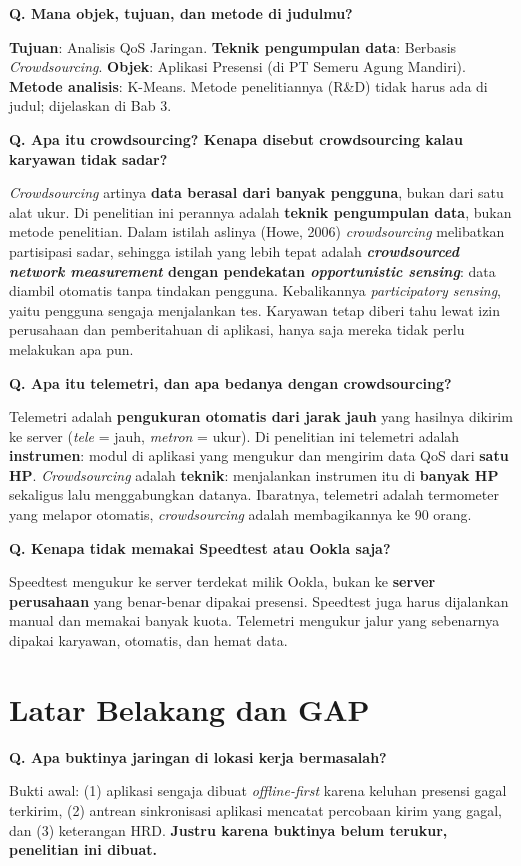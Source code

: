\documentclass[11pt,a4paper]{article}
\newcounter{q}
\newcommand{\tanya}[2]{\stepcounter{q}%
\par\vspace{6pt}\noindent\colorbox{band}{\parbox{\dimexpr\linewidth-2\fboxsep}{\textbf{Q\arabic{q}. #1}}}\par\vspace{2pt}#2\par}
\begin{document}
\tanya{Mana objek, tujuan, dan metode di judulmu?}{\textbf{Tujuan}: Analisis QoS Jaringan. \textbf{Teknik pengumpulan data}: Berbasis \textit{Crowdsourcing}. \textbf{Objek}: Aplikasi Presensi (di PT Semeru Agung Mandiri). \textbf{Metode analisis}: K-Means. Metode penelitiannya (R\&D) tidak harus ada di judul; dijelaskan di Bab 3.}

\tanya{Apa itu crowdsourcing? Kenapa disebut crowdsourcing kalau karyawan tidak sadar?}{\textit{Crowdsourcing} artinya \textbf{data berasal dari banyak pengguna}, bukan dari satu alat ukur. Di penelitian ini perannya adalah \textbf{teknik pengumpulan data}, bukan metode penelitian. Dalam istilah aslinya (Howe, 2006) \textit{crowdsourcing} melibatkan partisipasi sadar, sehingga istilah yang lebih tepat adalah \textbf{\textit{crowdsourced network measurement} dengan pendekatan \textit{opportunistic sensing}}: data diambil otomatis tanpa tindakan pengguna. Kebalikannya \textit{participatory sensing}, yaitu pengguna sengaja menjalankan tes. Karyawan tetap diberi tahu lewat izin perusahaan dan pemberitahuan di aplikasi, hanya saja mereka tidak perlu melakukan apa pun.}

\tanya{Apa itu telemetri, dan apa bedanya dengan crowdsourcing?}{Telemetri adalah \textbf{pengukuran otomatis dari jarak jauh} yang hasilnya dikirim ke server (\textit{tele} = jauh, \textit{metron} = ukur). Di penelitian ini telemetri adalah \textbf{instrumen}: modul di aplikasi yang mengukur dan mengirim data QoS dari \textbf{satu HP}. \textit{Crowdsourcing} adalah \textbf{teknik}: menjalankan instrumen itu di \textbf{banyak HP} sekaligus lalu menggabungkan datanya. Ibaratnya, telemetri adalah termometer yang melapor otomatis, \textit{crowdsourcing} adalah membagikannya ke 90 orang.}

\tanya{Kenapa tidak memakai Speedtest atau Ookla saja?}{Speedtest mengukur ke server terdekat milik Ookla, bukan ke \textbf{server perusahaan} yang benar-benar dipakai presensi. Speedtest juga harus dijalankan manual dan memakai banyak kuota. Telemetri mengukur jalur yang sebenarnya dipakai karyawan, otomatis, dan hemat data.}

\section{Latar Belakang dan GAP}

\tanya{Apa buktinya jaringan di lokasi kerja bermasalah?}{Bukti awal: (1) aplikasi sengaja dibuat \textit{offline-first} karena keluhan presensi gagal terkirim, (2) antrean sinkronisasi aplikasi mencatat percobaan kirim yang gagal, dan (3) keterangan HRD. \textbf{Justru karena buktinya belum terukur, penelitian ini dibuat.}}
\end{document}
